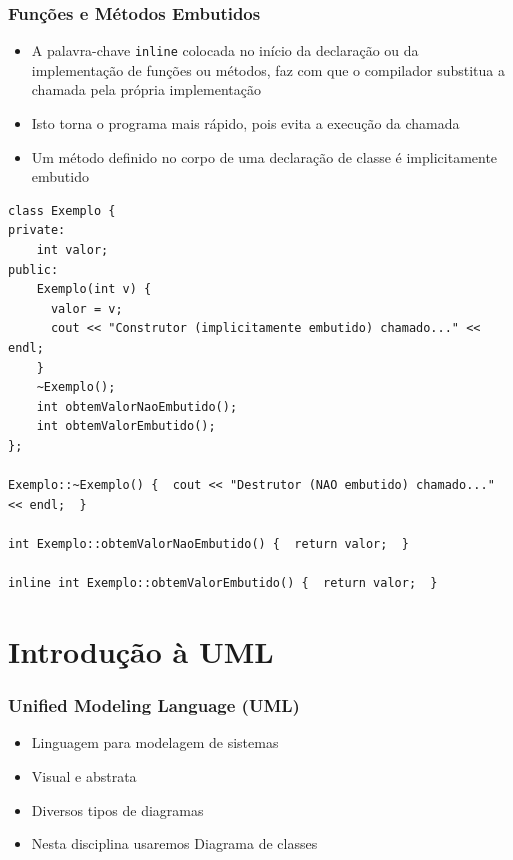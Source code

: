 \documentclass[aspectratio=169]{beamer}
\begin{document}
\begin{frame}[fragile]\frametitle{Funções e Métodos Embutidos}
\begin{itemize}
	\item A palavra-chave \texttt{inline} colocada no início da declaração ou da implementação de funções ou métodos, faz com que o compilador substitua a chamada pela própria implementação
	\item Isto torna o programa mais rápido, pois evita a execução da chamada
	\item Um método definido no corpo de uma declaração de classe é implicitamente embutido
\end{itemize}
\begin{lstlisting}[basicstyle=\ttfamily\tiny	]
class Exemplo {
private:
    int valor;
public:
    Exemplo(int v) {
      valor = v;
      cout << "Construtor (implicitamente embutido) chamado..." << endl;
    }
    ~Exemplo();
    int obtemValorNaoEmbutido();
    int obtemValorEmbutido();
};

Exemplo::~Exemplo() {  cout << "Destrutor (NAO embutido) chamado..." << endl;  }

int Exemplo::obtemValorNaoEmbutido() {  return valor;  }

inline int Exemplo::obtemValorEmbutido() {  return valor;  }
\end{lstlisting}
\end{frame}

\section{Introdução à UML}

\begin{frame}\frametitle{Unified Modeling Language (UML)}
\begin{itemize}
	\item Linguagem para modelagem de sistemas
	\item Visual e abstrata
	\item Diversos tipos de diagramas
	\item Nesta disciplina usaremos Diagrama de classes
\end{itemize}
\end{frame}
\end{document}
